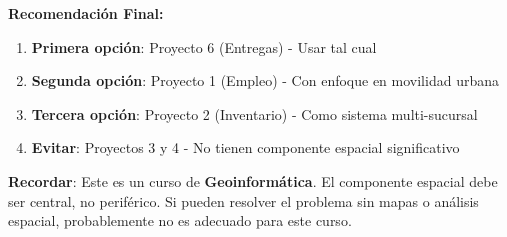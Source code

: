 \documentclass[11pt,a4paper]{article}
\begin{document}
\begin{tcolorbox}[colframe=usachblue,colback=blue!5]
\textbf{Recomendación Final:}
\begin{enumerate}
    \item \textbf{Primera opción}: Proyecto 6 (Entregas) - Usar tal cual
    \item \textbf{Segunda opción}: Proyecto 1 (Empleo) - Con enfoque en movilidad urbana
    \item \textbf{Tercera opción}: Proyecto 2 (Inventario) - Como sistema multi-sucursal
    \item \textbf{Evitar}: Proyectos 3 y 4 - No tienen componente espacial significativo
\end{enumerate}

\vspace{0.3cm}
\textbf{Recordar}: Este es un curso de \textbf{Geoinformática}. El componente espacial debe ser central, no periférico. Si pueden resolver el problema sin mapas o análisis espacial, probablemente no es adecuado para este curso.
\end{tcolorbox}
\end{document}
